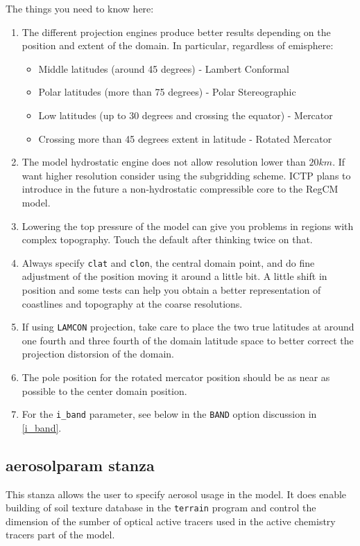 The things you need to know here:

\begin{enumerate}
\item The different projection engines produce better results depending on the
position and extent of the domain. In particular, regardless of emisphere:
\begin{itemize}
\item Middle latitudes (around 45 degrees) - Lambert Conformal
\item Polar latitudes (more than 75 degrees) - Polar Stereographic
\item Low latitudes (up to 30 degrees and crossing the equator) - Mercator
\item Crossing more than 45 degrees extent in latitude - Rotated Mercator
\end{itemize}
\item The model hydrostatic engine does not allow resolution lower than
$20 km$. If want higher resolution consider using the subgridding scheme.
ICTP plans to introduce in the future a non-hydrostatic compressible core to
the RegCM model.
\item Lowering the top pressure of the model can give you problems in regions
with complex topography. Touch the default after thinking twice on that.
\item Always specify \verb=clat= and \verb=clon=, the central domain point,
and do fine adjustment of the position moving it around a little bit. A
little shift in position and some tests can help you obtain a better
representation of coastlines and topography at the coarse resolutions.
\item If using \verb=LAMCON= projection, take care to place the two
true latitudes at around one fourth and three fourth of the domain latitude
space to better correct the projection distorsion of the domain.
\item The pole position for the rotated mercator position should be as near as
possible to the center domain position.
\item For the \verb=i_band= parameter, see below in the \verb=BAND= option
discussion in \ref{i_band}.
\end{enumerate}

\subsection{aerosolparam stanza}
\label{aerosolparam}
This stanza allows the user to specify aerosol usage in the model. It does
enable building of soil texture database in the \verb=terrain= program and
control the dimension of the sumber of optical active tracers used in the
active chemistry tracers part of the model.

